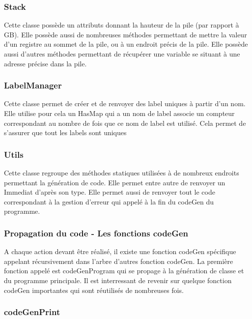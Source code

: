 \documentclass[12pt, a4paper, one side]{article}
\begin{document}
    \subsubsection{Stack}

    Cette classe possède un attributs donnant la hauteur de la pile (par rapport à GB). Elle possède aussi
    de nombreuses méthodes permettant de mettre la valeur d'un registre au sommet de la pile, ou à un
    endroit précis de la pile. Elle possède aussi d'autres méthodes permettant de récupérer une variable
    se situant à une adresse précise dans la pile.

    \subsubsection{LabelManager}

    Cette classe permet de créer et de renvoyer des label uniques à partir d'un nom. Elle utilise pour cela un HasMap
    qui a un nom de label associe un compteur correspondant au nombre de fois que ce nom de label est utilisé. Cela
    permet de s'assurer que tout les labels sont uniques

    \subsubsection{Utils}

    Cette classe regroupe des méthodes statiques utilisées à de nombreux endroits permettant la génération
    de code. Elle permet entre autre de renvoyer un Immediat d'après son type. Elle permet aussi de renvoyer tout
    le code correspondant à la gestion d'erreur qui appelé à la fin du codeGen du programme.

    \subsubsection{Propagation du code - Les fonctions codeGen}

    A chaque action devant être réalisé, il existe une fonction codeGen spécifique appelant récursivement dans l'arbre
    d'autres fonction codeGen. La première fonction appelé est codeGenProgram qui se propage à la génération de classe
    et du programme principale. Il est interressant de revenir sur quelque fonction codeGen importantes qui sont réutilisés
    de nombreuses fois.

    \subsubsection{codeGenPrint}
\end{document}
